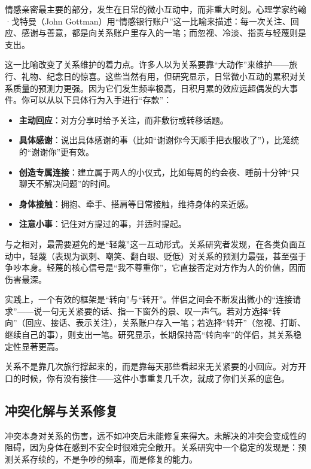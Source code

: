 \documentclass[12pt,UTF8]{ctexbook}
\begin{document}
情感亲密最主要的部分，发生在日常的微小互动中，而非重大时刻。心理学家约翰·戈特曼（John Gottman）用“情感银行账户”这一比喻来描述：每一次关注、回应、感谢与善意，都是向关系账户里存入的一笔；而忽视、冷淡、指责与轻蔑则是支出。

这一比喻改变了关系维护的着力点。许多人以为关系要靠“大动作”来维护——旅行、礼物、纪念日的惊喜。这些当然有用，但研究显示，日常微小互动的累积对关系质量的预测力更强。因为它们发生频率极高，日积月累的效应远超偶发的大事件。你可以从以下具体行为入手进行“存款”：

\begin{itemize}
\item \textbf{主动回应}：对方分享时给予关注，而非敷衍或转移话题。
\item \textbf{具体感谢}：说出具体感谢的事（比如“谢谢你今天顺手把衣服收了”），比笼统的“谢谢你”更有效。
\item \textbf{创造专属连接}：建立属于两人的小仪式，比如每周的约会夜、睡前十分钟“只聊天不解决问题”的时间。
\item \textbf{身体接触}：拥抱、牵手、搭肩等日常接触，维持身体的亲近感。
\item \textbf{注意小事}：记住对方提过的事，并适时提起。
\end{itemize}

与之相对，最需要避免的是“轻蔑”这一互动形式。关系研究者发现，在各类负面互动中，轻蔑（表现为讽刺、嘲笑、翻白眼、贬低）对关系的预测力最强，甚至强于争吵本身。轻蔑的核心信号是“我不尊重你”，它直接否定对方作为人的价值，因而伤害最深。

实践上，一个有效的框架是“转向”与“转开”。伴侣之间会不断发出微小的“连接请求”——说一句无关紧要的话、指一下窗外的景、叹一声气。若对方选择“转向”（回应、接话、表示关注），关系账户存入一笔；若选择“转开”（忽视、打断、继续自己的事），则支出一笔。研究显示，长期保持高“转向率”的伴侣，其关系稳定性显著更高。

\begin{tcolorbox}[colback=pink!5!white,colframe=red!50!black,title=贴心小叮咛]
关系不是靠几次旅行撑起来的，而是靠每天那些看起来无关紧要的小回应。对方开口的时候，你有没有接住——这件小事重复几千次，就成了你们关系的底色。
\end{tcolorbox}

\subsection{冲突化解与关系修复}

冲突本身对关系的伤害，远不如冲突后未能修复来得大。未解决的冲突会变成性的阻碍，因为身体在感到不安全时很难完全敞开。关系研究中一个稳定的发现是：预测关系存续的，不是争吵的频率，而是修复的能力。
\end{document}
